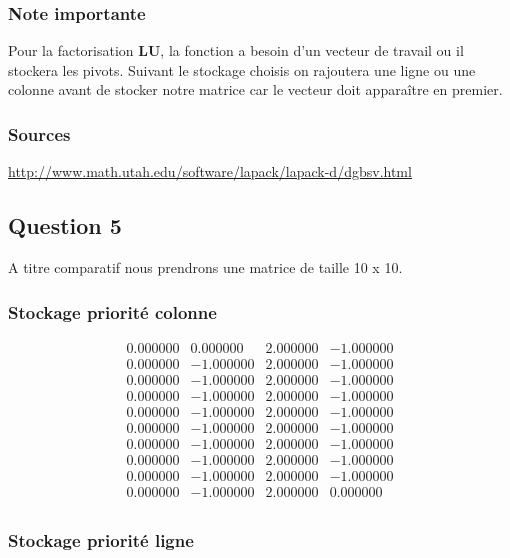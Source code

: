 \documentclass[11pt]{article}
\begin{document}
\subsubsection{Note importante}

Pour la factorisation \textbf{LU}, la fonction a besoin d'un vecteur de
travail ou il stockera les pivots. Suivant le stockage choisis on
rajoutera une ligne ou une colonne avant de stocker notre matrice
car le vecteur doit apparaître en premier.

\subsubsection{Sources}

\url{http://www.math.utah.edu/software/lapack/lapack-d/dgbsv.html}
   
\subsection{Question 5}
A titre comparatif nous prendrons une matrice de taille 10 x 10.

\subsubsection{Stockage priorité colonne}

\begin{equation*}
  \begin{array}{rrrr}
    0.000000 &	0.000000  &	2.000000 &	-1.000000	\\
    0.000000 &	-1.000000 &	2.000000 &	-1.000000	\\
    0.000000 &	-1.000000 &	2.000000 &	-1.000000	\\
    0.000000 &	-1.000000 &	2.000000 &	-1.000000	\\
    0.000000 &	-1.000000 &	2.000000 &	-1.000000	\\
    0.000000 &	-1.000000 &	2.000000 &	-1.000000	\\
    0.000000 &	-1.000000 &	2.000000 &	-1.000000	\\
    0.000000 &	-1.000000 &	2.000000 &	-1.000000	\\
    0.000000 &	-1.000000 &	2.000000 &	-1.000000	\\
    0.000000 &	-1.000000 &	2.000000 &	0.000000	\\
  \end{array}
\end{equation*}

\subsubsection{Stockage priorité ligne}
\end{document}
